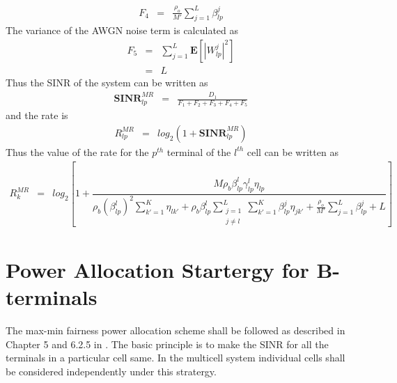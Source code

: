 \documentclass[10pt, a4paper, twoside,fleqn]{article}
\begin{document}
\begin{eqnarray}\label{eqn:noiseF4}
	F_4 &=& \frac{\rho_o}{M'}\sum_{j=1}^{L}\beta_{lp}^{j}
\end{eqnarray}
The variance of the AWGN noise term is calculated as 
\begin{eqnarray}\label{eqn:noiseF5}
	F_5 &=& \sum_{j=1}^{L} \mathbf{E}\left[|W_{lp}^{j}|^2\right] \nonumber \\
            &=& L
\end{eqnarray}
Thus the SINR of the system can be written as 
\begin{eqnarray}\label{eqn:sinrexp}
	\mathbf{SINR}_{lp}^{MR} &=& \frac{D_1}{F_1+F_2+F_3+F_4+F_5}
\end{eqnarray}
and the rate is 
\begin{eqnarray}\label{eqn:rateexp}
	R_{lp}^{MR} &=& log_2(1+\mathbf{SINR}_{lp}^{MR})
\end{eqnarray}
Thus the value of the rate for the $p^{th}$ terminal of the $l^{th}$ cell can be written as
\begin{eqnarray}\label{eqn:rateot}
	R_k^{MR} &=& log_2\left[1+ \dfrac{M\rho_b\beta_{lp}^{l}\gamma_{lp}^{l}\eta_{lp}}
                                         {\rho_b(\beta_{lp}^{l})^2\sum\limits_{k' = 1}^{K}\eta_{lk'}
                                                   +\rho_b\beta_{lp}^{l} \sum\limits_{\substack{j=1 \\ j \neq l}}^{L} \sum\limits_{k' = 1}^{K}\beta^{j}_{lp}\eta_{jk'}
						   +\frac{\rho_o}{M'} \sum\limits_{j=1}^{L}\beta_{lp}^{j}
						   +L}\right]
\end{eqnarray}

\section{Power Allocation Startergy for B-terminals}
  The max-min fairness power allocation scheme shall be followed as described in Chapter 5 and 6.2.5 in \cite{bib:MassiveMimoBook}. The basic principle is to make the SINR for all the terminals in a particular cell same. In the multicell system individual cells shall be considered independently under this stratergy. 
\end{document}
